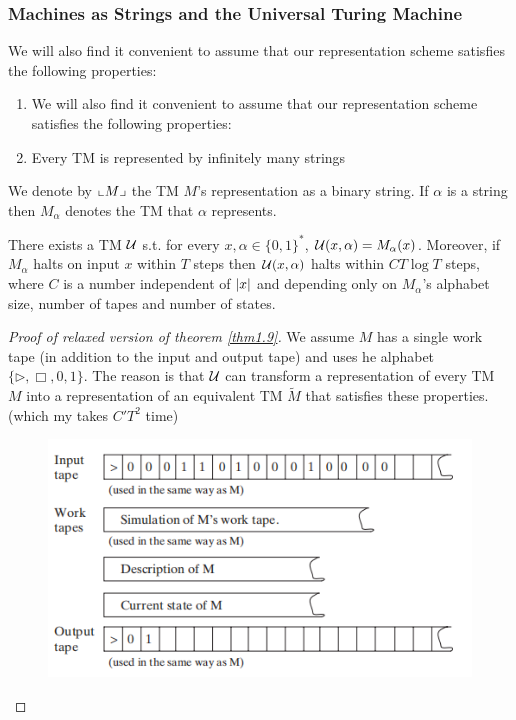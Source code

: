 \documentclass[11pt]{article}
\begin{document}
\subsubsection{Machines as Strings and the Universal Turing Machine}
\label{sec:org551d478}
We will also find it convenient to assume that our representation scheme satisfies the following
properties:
\begin{enumerate}
\item We will also find it convenient to assume that our representation scheme satisfies the
following properties:
\item Every TM is represented by infinitely many strings
\end{enumerate}

We denote by \(\llcorner M \lrcorner\) the TM \(M\)'s representation as a binary string. If \(\alpha\) is a string
then \(M_\alpha\) denotes the TM that \(\alpha\) represents.

\begin{theorem}
\label{thm1.9}
There exists a TM \(\mathcal{U}\) s.t. for
every \(x,\alpha\in\{0,1\}^*\), \(\mathcal{U}(x,\alpha)=M_\alpha(x)\). Moreover, if \(M_{\alpha}\) halts on
input \(x\) within \(T\) steps then \(\mathcal{U}(x,\alpha)\) halts within \(CT\log T\) steps, where \(C\)
is a number independent of \(\abs{x}\) and depending only on \(M_\alpha\)'s alphabet size,
number of tapes and number of states.
\end{theorem}

\begin{proof}[Proof of relaxed version of theorem \ref{thm1.9}]
We assume \(M\) has a single work tape (in addition to the input and output tape) and uses he
alphabet \(\{\rhd,\Box,0,1\}\). The reason is that \(\mathcal{U}\) can transform a representation of
every TM \(M\) into a representation of an equivalent TM \(\tilde{M}\) that satisfies these
properties. (which my takes \(C'T^2\) time)

\begin{figure}[htbp]
\centering
\includegraphics[width=.5\textwidth]{../images/ComputationalComplexity/3.png}
\end{figure}
\end{proof}
\end{document}
